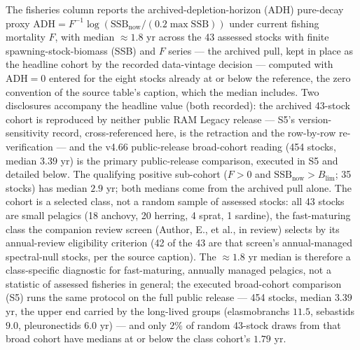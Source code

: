\documentclass[11pt]{article}
\begin{document}
The fisheries column reports the archived-depletion-horizon (ADH)
pure-decay proxy
\(\mathrm{ADH} = F^{-1}\log(\mathrm{SSB}_{\mathrm{now}}/(0.2\max\mathrm{SSB}))\)
under current fishing mortality \(F\), with median \(\approx 1.8\) yr
across the 43 assessed stocks with finite spawning-stock-biomass (SSB)
and \(F\) series --- the archived pull, kept in place as the headline
cohort by the recorded data-vintage decision --- computed with
\(\mathrm{ADH} = 0\) entered for the eight stocks already at or below
the reference, the zero convention of the source table's caption, which
the median includes. Two disclosures accompany the headline value (both
recorded): the archived 43-stock cohort is reproduced by neither public
RAM Legacy release --- S5's version-sensitivity record, cross-referenced
here, is the retraction and the row-by-row re-verification --- and the
v4.66 public-release broad-cohort reading (454 stocks, median \(3.39\)
yr) is the primary public-release comparison, executed in S5 and
detailed below. The qualifying positive sub-cohort (\(F > 0\) and
\(\mathrm{SSB}_{\mathrm{now}} > B_{\lim}\); 35 stocks) has median
\(2.9\) yr; both medians come from the archived pull alone. The cohort
is a selected class, not a random sample of assessed stocks: all 43
stocks are small pelagics (18 anchovy, 20 herring, 4 sprat, 1 sardine),
the fast-maturing class the companion review screen (Author, E., et al.,
in review) selects by its annual-review eligibility criterion (42 of the
43 are that screen's annual-managed spectral-null stocks, per the source
caption). The \(\approx 1.8\) yr median is therefore a class-specific
diagnostic for fast-maturing, annually managed pelagics, not a statistic
of assessed fisheries in general; the executed broad-cohort comparison
(S5) runs the same protocol on the full public release --- 454 stocks,
median \(3.39\) yr, the upper end carried by the long-lived groups
(elasmobranchs \(11.5\), sebastids \(9.0\), pleuronectids \(6.0\) yr)
--- and only \(2\%\) of random 43-stock draws from that broad cohort
have medians at or below the class cohort's \(1.79\) yr.
\end{document}
